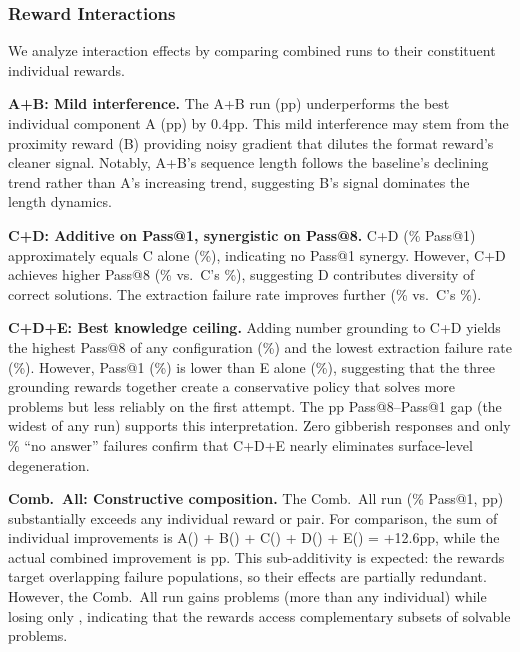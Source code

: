 \subsubsection{Reward Interactions}
\nestindent

We analyze interaction effects by comparing combined runs to their constituent individual rewards.

\textbf{A+B: Mild interference.}
The A+B run (\pFourCombinedAbDeltaPassOne{}pp) underperforms the best individual component A (\pFourSeparateADeltaPassOne{}pp) by 0.4pp.
This mild interference may stem from the proximity reward (B) providing noisy gradient that dilutes the format reward's cleaner signal.
Notably, A+B's sequence length follows the baseline's declining trend rather than A's increasing trend, suggesting B's signal dominates the length dynamics.

\textbf{C+D: Additive on Pass@1, synergistic on Pass@8.}
C+D (\pFourCombinedCdPassOne\% Pass@1) approximately equals C alone (\pFourSeparateCPassOne\%), indicating no Pass@1 synergy.
However, C+D achieves higher Pass@8 (\pFourCombinedCdPassEight\% vs.\ C's \pFourSeparateCPassEight\%), suggesting D contributes diversity of correct solutions.
The extraction failure rate improves further (\pFourCombinedCdExtrFail\% vs.\ C's \pFourSeparateCExtrFail\%).

\textbf{C+D+E: Best knowledge ceiling.}
Adding number grounding to C+D yields the highest Pass@8 of any configuration (\pFourCombinedCdePassEight\%) and the lowest extraction failure rate (\pFourCombinedCdeExtrFail\%).
However, Pass@1 (\pFourCombinedCdePassOne\%) is lower than E alone (\pFourSeparateEPassOne\%), suggesting that the three grounding rewards together create a conservative policy that solves more problems but less reliably on the first attempt.
The \pFourCombinedCdeGap{}pp Pass@8--Pass@1 gap (the widest of any run) supports this interpretation.
Zero gibberish responses and only \pFourCombinedCdeNoAnswer\% ``no answer'' failures confirm that C+D+E nearly eliminates surface-level degeneration.

\textbf{Comb.\ All: Constructive composition.}
The Comb.\ All run (\pFourCombinedAllPassOne\% Pass@1, \pFourCombinedAllDeltaPassOne{}pp) substantially exceeds any individual reward or pair.
For comparison, the sum of individual improvements is A(\pFourSeparateADeltaPassOne) + B(\pFourSeparateBDeltaPassOne) + C(\pFourSeparateCDeltaPassOne) + D(\pFourSeparateDDeltaPassOne) + E(\pFourSeparateEDeltaPassOne) = +12.6pp, while the actual combined improvement is \pFourCombinedAllDeltaPassOne{}pp.
This sub-additivity is expected: the rewards target overlapping failure populations, so their effects are partially redundant.
However, the Comb.\ All run gains \pFourCombinedAllGained{} problems (more than any individual) while losing only \pFourCombinedAllLost, indicating that the rewards access complementary subsets of solvable problems.

